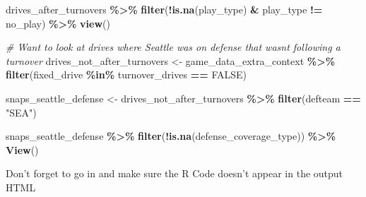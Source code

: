 \documentclass[
]{article}
\newenvironment{Shaded}{\begin{snugshade}}{\end{snugshade}}
\newcommand{\CommentTok}[1]{\textcolor[rgb]{0.56,0.35,0.01}{\textit{#1}}}
\newcommand{\ConstantTok}[1]{\textcolor[rgb]{0.56,0.35,0.01}{#1}}
\newcommand{\FunctionTok}[1]{\textcolor[rgb]{0.13,0.29,0.53}{\textbf{#1}}}
\newcommand{\NormalTok}[1]{#1}
\newcommand{\OtherTok}[1]{\textcolor[rgb]{0.56,0.35,0.01}{#1}}
\newcommand{\SpecialCharTok}[1]{\textcolor[rgb]{0.81,0.36,0.00}{\textbf{#1}}}
\newcommand{\StringTok}[1]{\textcolor[rgb]{0.31,0.60,0.02}{#1}}
\begin{document}
\begin{Shaded}
\begin{Highlighting}[]
\NormalTok{drives\_after\_turnovers }\SpecialCharTok{\%\textgreater{}\%} 
  \FunctionTok{filter}\NormalTok{(}\SpecialCharTok{!}\FunctionTok{is.na}\NormalTok{(play\_type) }\SpecialCharTok{\&}\NormalTok{ play\_type }\SpecialCharTok{!=} \StringTok{\textquotesingle{}no\_play\textquotesingle{}}\NormalTok{) }\SpecialCharTok{\%\textgreater{}\%} \FunctionTok{view}\NormalTok{()}
\end{Highlighting}
\end{Shaded}

\begin{Shaded}
\begin{Highlighting}[]
\CommentTok{\# Want to look at drives where Seattle was on defense that wasn\textquotesingle{}t following a turnover}
\NormalTok{drives\_not\_after\_turnovers }\OtherTok{\textless{}{-}}\NormalTok{ game\_data\_extra\_context }\SpecialCharTok{\%\textgreater{}\%}
  \FunctionTok{filter}\NormalTok{(fixed\_drive }\SpecialCharTok{\%in\%}\NormalTok{ turnover\_drives }\SpecialCharTok{==} \ConstantTok{FALSE}\NormalTok{)}

  
\NormalTok{snaps\_seattle\_defense }\OtherTok{\textless{}{-}}\NormalTok{ drives\_not\_after\_turnovers }\SpecialCharTok{\%\textgreater{}\%} \FunctionTok{filter}\NormalTok{(defteam }\SpecialCharTok{==} \StringTok{"SEA"}\NormalTok{)  }

\NormalTok{snaps\_seattle\_defense }\SpecialCharTok{\%\textgreater{}\%} \FunctionTok{filter}\NormalTok{(}\SpecialCharTok{!}\FunctionTok{is.na}\NormalTok{(defense\_coverage\_type)) }\SpecialCharTok{\%\textgreater{}\%} \FunctionTok{View}\NormalTok{()}
\end{Highlighting}
\end{Shaded}

Don't forget to go in and make sure the R Code doesn't appear in the
output HTML
\end{document}

